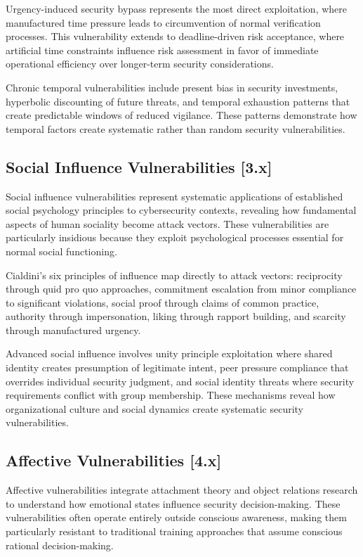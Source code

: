 \documentclass[11pt,a4paper]{article}
\begin{document}
Urgency-induced security bypass represents the most direct exploitation, where manufactured time pressure leads to circumvention of normal verification processes. This vulnerability extends to deadline-driven risk acceptance, where artificial time constraints influence risk assessment in favor of immediate operational efficiency over longer-term security considerations.

Chronic temporal vulnerabilities include present bias in security investments, hyperbolic discounting of future threats, and temporal exhaustion patterns that create predictable windows of reduced vigilance. These patterns demonstrate how temporal factors create systematic rather than random security vulnerabilities.

\subsection{Social Influence Vulnerabilities [3.x]}

Social influence vulnerabilities represent systematic applications of established social psychology principles to cybersecurity contexts, revealing how fundamental aspects of human sociality become attack vectors. These vulnerabilities are particularly insidious because they exploit psychological processes essential for normal social functioning.

Cialdini's six principles of influence map directly to attack vectors: reciprocity through quid pro quo approaches, commitment escalation from minor compliance to significant violations, social proof through claims of common practice, authority through impersonation, liking through rapport building, and scarcity through manufactured urgency.

Advanced social influence involves unity principle exploitation where shared identity creates presumption of legitimate intent, peer pressure compliance that overrides individual security judgment, and social identity threats where security requirements conflict with group membership. These mechanisms reveal how organizational culture and social dynamics create systematic security vulnerabilities.

\subsection{Affective Vulnerabilities [4.x]}

Affective vulnerabilities integrate attachment theory and object relations research to understand how emotional states influence security decision-making. These vulnerabilities often operate entirely outside conscious awareness, making them particularly resistant to traditional training approaches that assume conscious rational decision-making.
\end{document}
